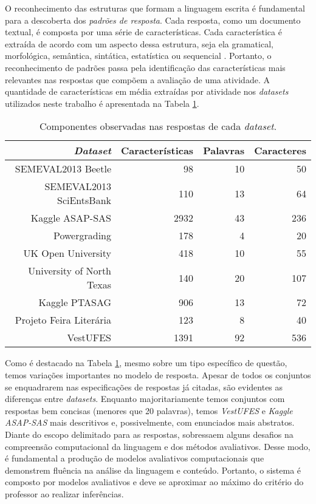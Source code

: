 O reconhecimento das estruturas que formam a linguagem escrita é fundamental para a descoberta dos \textit{padrões de resposta}. Cada resposta, como um documento textual, é composta por uma série de características. Cada característica é extraída de acordo com um aspecto dessa estrutura, seja ela gramatical, morfológica, semântica, sintática, estatística ou sequencial \cite{kumar2019}. Portanto, o reconhecimento de padrões passa pela identificação das características mais relevantes nas respostas que compõem a avaliação de uma atividade. A quantidade de características em média extraídas por atividade nos \textit{datasets} utilizados neste trabalho é apresentada na Tabela \ref{tab-features}.

\begin{table}
\centering
\caption{Componentes observadas nas respostas de cada \textit{dataset}.}
\label{tab-features}
\begin{tabular}{|r | r r r|} \hline
\textit{Dataset} & Características & Palavras & Caracteres \\
\hline
 SEMEVAL2013 Beetle & 98 & 10 & 50 \\
 SEMEVAL2013 SciEntsBank & 110 & 13 & 64 \\
 Kaggle ASAP-SAS & 2932 & 43 & 236 \\
 Powergrading & 178 & 4 & 20 \\
 UK Open University & 418 & 10 & 55 \\
 University of North Texas & 140 & 20 & 107 \\
 Kaggle PTASAG & 906 & 13 & 72 \\
 Projeto Feira Liter{\'a}ria & 123 & 8 & 40 \\
 VestUFES & 1391 & 92 & 536 \\
\hline \hline
\end{tabular}
\end{table}

Como é destacado na Tabela \ref{tab-features}, mesmo sobre um tipo específico de questão, temos variações importantes no modelo de resposta. Apesar de todos os conjuntos se enquadrarem nas especificações de respostas já citadas, são evidentes as diferenças entre \textit{datasets}. Enquanto majoritariamente temos conjuntos com respostas bem concisas (menores que 20 palavras), temos \textit{VestUFES} e \textit{Kaggle ASAP-SAS} mais descritivos e, possivelmente, com enunciados mais abstratos. Diante do escopo delimitado para as respostas, sobressaem alguns desafios na compreensão computacional da linguagem e dos métodos avaliativos. Desse modo, é fundamental a produção de modelos avaliativos computacionais que demonstrem fluência na análise da linguagem e conteúdo. Portanto, o sistema é composto por modelos avaliativos e deve se aproximar ao máximo do critério do professor ao realizar inferências.

